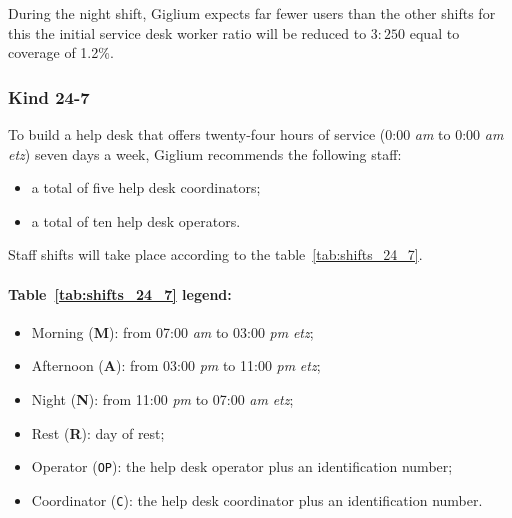 \begin{tcolorbox}
	During the night shift, Giglium expects far fewer users than the other shifts for this the initial service desk worker ratio will be reduced to $3:250$ equal to coverage of 1.2\%.
\end{tcolorbox}

\subsubsection{Kind 24{-}7}\label{24_7}
To build a help desk that offers twenty-four hours of service (0:00 \textit{\gls{am}} to 0:00 \textit{\gls{am}} \textit{\gls{etz}}) seven days a week, Giglium recommends the following staff:
\begin{itemize}
	\item a total of five help desk coordinators;
	\item a total of ten help desk operators.
\end{itemize}

\noindent Staff shifts will take place according to the table~\ref{tab:shifts_24_7}.

\paragraph{Table~\ref{tab:shifts_24_7} legend:}
\begin{itemize}
	\item Morning (\textbf{M}): from 07:00 \textit{\gls{am}} to 03:00 \textit{\gls{pm}} \textit{\gls{etz}};
	\item Afternoon (\textbf{A}): from 03:00 \textit{\gls{pm}} to 11:00 \textit{\gls{pm}} \textit{\gls{etz}};
	\item Night (\textbf{N}): from 11:00 \textit{\gls{pm}} to 07:00 \textit{\gls{am}} \textit{\gls{etz}};
	\item Rest (\textbf{R}): day of rest;
	\item Operator (\texttt{OP}): the help desk operator plus an identification number;
	\item Coordinator (\texttt{C}): the help desk coordinator plus an identification number.
\end{itemize}

